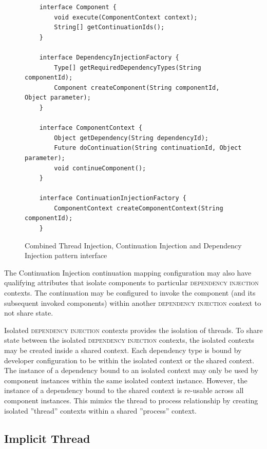 \documentclass[prodmode]{style/acmlarge}
\begin{document}
\begin{figure}[tp]
\centering
\begin{verbatim}
    interface Component {
        void execute(ComponentContext context);
        String[] getContinuationIds();
    }

    interface DependencyInjectionFactory {
        Type[] getRequiredDependencyTypes(String componentId);
        Component createComponent(String componentId, Object parameter);
    }

    interface ComponentContext {
        Object getDependency(String dependencyId);
        Future doContinuation(String continuationId, Object parameter);
        void continueComponent();
    }

    interface ContinuationInjectionFactory {
        ComponentContext createComponentContext(String componentId);
    }
\end{verbatim}
\caption{Combined Thread Injection, Continuation Injection and Dependency Injection pattern interface\footnotemark}
\label{fig:IocInjectionInterfaces}
\end{figure}


The Continuation Injection continuation mapping configuration may also
have qualifying attributes that isolate components to particular
\textsc{dependency injection} contexts.  The continuation may be configured to
invoke the component (and its subsequent invoked components) within another
\textsc{dependency injection} context to not share state.

Isolated \textsc{dependency injection} contexts provides the isolation of
threads.  To share state between the isolated \textsc{dependency injection}
contexts, the isolated contexts may be created inside a shared context.  Each
dependency type is bound by developer configuration to be within the isolated
context or the shared context.  The instance of a dependency bound to an
isolated context may only be used by component instances within the same
isolated context instance.  However, the instance of a dependency bound to the
shared context is re-usable across all component instances.  This mimics the
thread to process relationship by creating isolated ''thread'' contexts within a
shared ''process'' context.


\subsection{Implicit Thread}
\end{document}
